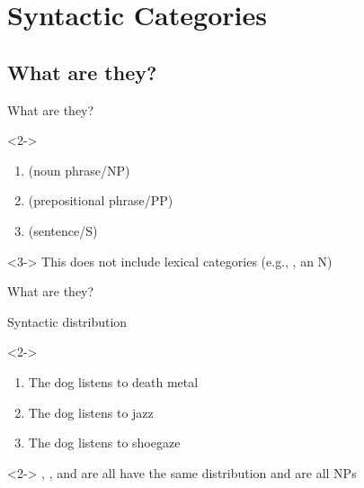 \documentclass{beamer}
\subtitle[Syntactic Categories]{Syntactic Categories}
\newcommand{\suboneone}{What are they?}
\begin{document}
  

  \section{Syntactic Categories}
    \subsection{\suboneone}
      \begin{frame}{\suboneone}
        \begin{definition}
          
        \end{definition}
        \begin{example}<2->
          \begin{enumerate}
            \item {} \hfill (noun phrase/NP)
            \item {} \hfill (prepositional phrase/PP)
            \item {} \hfill (sentence/S)
          \end{enumerate}
        \end{example}
        \begin{alertblock}<3->{}
          This does not include lexical categories (e.g., , an N)
        \end{alertblock}
      \end{frame}

      \begin{frame}{\suboneone}
        \begin{alertblock}{Syntactic distribution}
          
        \end{alertblock}
        \begin{example}<2->
          \begin{enumerate}
            \item The dog listens to death metal
            \item The dog listens to jazz
            \item The dog listens to shoegaze
          \end{enumerate}
        \end{example}
        \begin{block}<2->{}
          , , and  are all have the same distribution and are all NPs
        \end{block}
      \end{frame}
\end{document}
